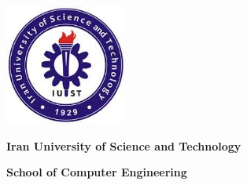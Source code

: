 \documentclass[11pt]{book}
\begin{document}
\newpage
\newcommand{\beginsupplement}{%
    \setcounter{chapter}{0}
    \renewcommand{\thechapter}{\Alph{chapter}}%
 }

\beginsupplement

\newpage 

\ %
\newpage 



\vspace*{3cm}
{
\centering
\includegraphics[width=4cm]{iust.jpeg}
\\
\bigbreak
\centerline {\textbf{Iran University of Science and Technology}}
\bigbreak
\large\centerline {\textbf{School of Computer Engineering}}
}
\end{document}
